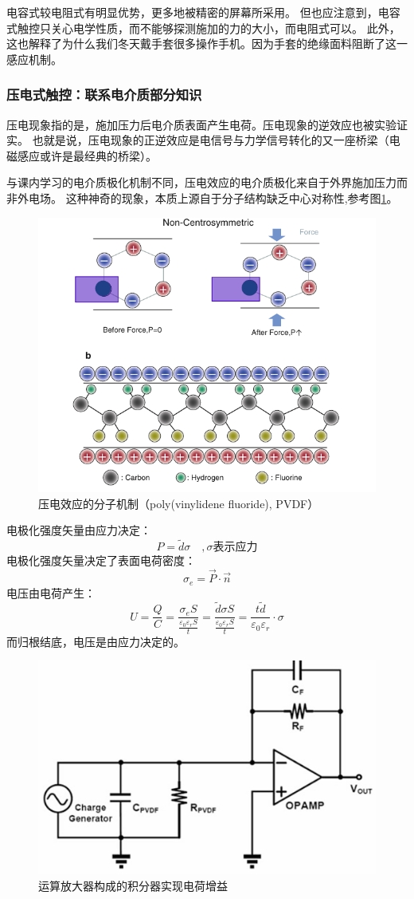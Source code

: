 \documentclass[UTF-8]{ctexart}
\begin{document}
电容式较电阻式有明显优势，更多地被精密的屏幕所采用。
但也应注意到，电容式触控只关心电学性质，而不能够探测施加的力的大小，而电阻式可以。
此外，这也解释了为什么我们冬天戴手套很多操作手机。因为手套的绝缘面料阻断了这一感应机制。
\subsubsection{压电式触控：联系电介质部分知识}
压电现象指的是，施加压力后电介质表面产生电荷。压电现象的逆效应也被实验证实。
也就是说，压电现象的正逆效应是电信号与力学信号转化的又一座桥梁（电磁感应或许是最经典的桥梁）。

与课内学习的电介质极化机制不同，压电效应的电介质极化来自于外界施加压力而非外电场。
这种神奇的现象，本质上源自于分子结构缺乏中心对称性,参考图\ref{压电效应的分子机制 }。
\begin{figure}
    \centering
    \includegraphics[width=0.7\linewidth]{../Figures/piezoelectric.png}
    \caption{压电效应的分子机制（poly(vinylidene fluoride), PVDF）\cite{Touch}}
    \label{压电效应的分子机制 }
\end{figure}
电极化强度矢量由应力决定：
$$
P=\tilde{d}\sigma\quad,\sigma\text{表示应力}
$$
电极化强度矢量决定了表面电荷密度：
$$
\sigma_{e}=\vec{P}\cdot \vec{n}
$$
电压由电荷产生：
$$
U=\frac{Q}{C}=\frac{\sigma_{e}S}{\frac{\varepsilon _0 \varepsilon _r S}{t}}=\frac{\tilde{d}\sigma S}{\frac{\varepsilon _0 \varepsilon _r S}{t}}=\frac{t\tilde{d} }{\varepsilon _0 \varepsilon _r}\cdot{\sigma}
$$
而归根结底，电压是由应力决定的。
\begin{figure}
    \centering
    \includegraphics[width=0.6\linewidth]{../Figures/opamp.png}
    \caption{运算放大器构成的积分器实现电荷增益\cite{Touch}}
    \label{运放}
\end{figure}
\end{document}
